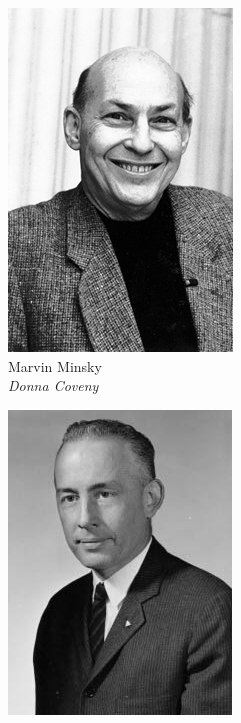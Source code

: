 \begin{frame}[t,fragile]
{\begin{minipage}[t]{.4\textwidth}
		\hfill
		\begin{minipage}[t]{0.45\textwidth}
			\centering
			\begin{figure}[ht]
				\includegraphics[width=.6\textwidth]{img/Marvin-Misky.png}
				{\tiny\\Marvin Minsky\\\vspace*{-1pt}\textit{\textcopyright Donna Coveny}}
			\end{figure}
		\end{minipage}
		\begin{minipage}[t]{0.45\textwidth}
			\centering
			\begin{figure}[ht]
				\includegraphics[width=.68\textwidth]{img/Nathaniel-Rochester.jpeg}

\end{figure}
\end{minipage}
\end{minipage}}
\end{frame}
